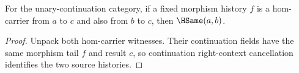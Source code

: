 
\begin{theorem}
\label{thm:category-hom-carrier-source-deterministic}
For the unary-continuation category, if a fixed morphism history $f$ is a
hom-carrier from $a$ to $c$ and also from $b$ to $c$, then
$\HSame(a,b)$.
\end{theorem}
\begin{proof}
Unpack both hom-carrier witnesses. Their continuation fields have the same
morphism tail $f$ and result $c$, so continuation right-context cancellation
identifies the two source histories.
\end{proof}
